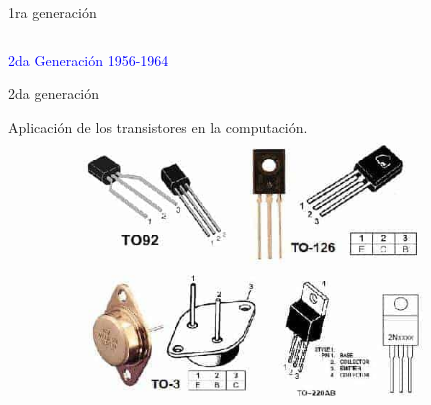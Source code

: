 \documentclass[10pt,xcolor={dvipsnames}]{beamer}
\begin{document}
\begin{frame}{1ra generación}
\begin{columns}
\begin{center}
\end{center}
\end{columns}
\end{frame}


\begin{frame}
\begin{center}
\Huge{\textcolor{blue}{2da Generación 1956-1964}}
\end{center}
\end{frame}

\begin{frame}{2da generación}
\begin{center}
Aplicación de los transistores en la computación. \pause
\includegraphics[scale=0.4]{Figures/Transistor}
\end{center}
\end{frame}
\end{document}
